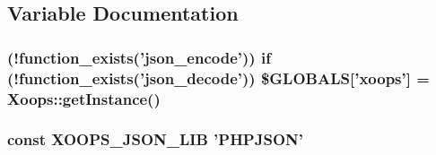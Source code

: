 \subsection{Variable Documentation}
\hypertarget{class_2json_8php_ab990bf70b4d23779b5e44c6ad5cbdf5d}{
\subsubsection[{\$\-G\-L\-O\-B\-A\-L\-S}]{ (!function\-\_\-exists('json\-\_\-encode')) {\bf if} (!function\-\_\-exists('json\-\_\-decode')) \$G\-L\-O\-B\-A\-L\-S\mbox{[}'xoops'\mbox{]} = Xoops\-::get\-Instance()}}\label{class_2json_8php_ab990bf70b4d23779b5e44c6ad5cbdf5d}
\hypertarget{class_2json_8php_a42fbc26b113afc08a5757bacf456cd8a}{
\subsubsection[{X\-O\-O\-P\-S\-\_\-\-J\-S\-O\-N\-\_\-\-L\-I\-B}]{\setlength{\rightskip}{0pt plus 5cm}const X\-O\-O\-P\-S\-\_\-\-J\-S\-O\-N\-\_\-\-L\-I\-B 'P\-H\-P\-J\-S\-O\-N'}}\label{class_2json_8php_a42fbc26b113afc08a5757bacf456cd8a}
